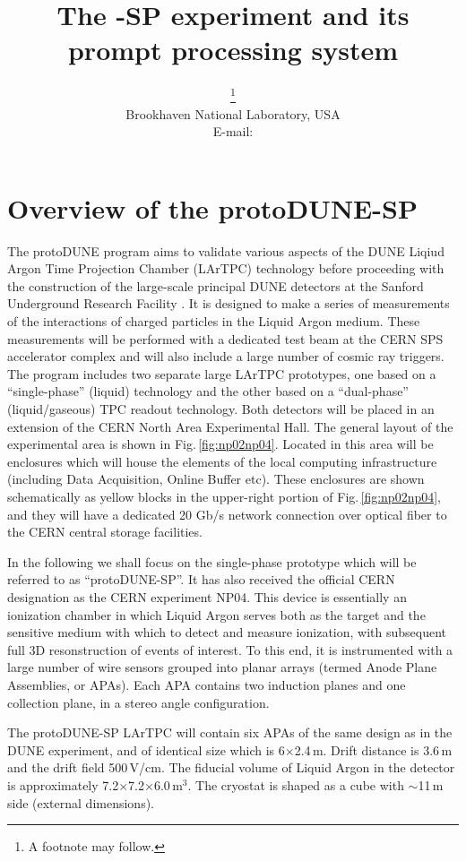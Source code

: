 \documentclass{PoS}
\title{The \pd-SP experiment and its prompt processing system}
\author{\speaker{Maxim Potekhin}\thanks{A footnote may follow.}\\
        Brookhaven National Laboratory, USA\\
        E-mail: \email{potekhin@bnl.gov}}
\newcommand{\pd}{protoDUNE\xspace}
\begin{document}
\section{Overview of the protoDUNE-SP}
The \pd program aims to validate various aspects of the DUNE  Liqiud Argon Time Projection Chamber (LArTPC)  technology 
before proceeding with the construction of the large-scale principal DUNE detectors at the Sanford Underground Research
Facility \cite{cdrVol1, cdrVol4}. It  is designed to make a series of measurements of the interactions of
charged particles in the Liquid Argon medium.  These measurements will be performed with a dedicated test
beam  at the CERN SPS accelerator complex and will also include
a large number of cosmic ray triggers. The program includes two separate
large LArTPC prototypes, one based on a ``single-phase'' (liquid) technology and
the other based on a ``dual-phase'' (liquid/gaseous) TPC readout technology.
Both detectors will be placed in an extension of the CERN North Area Experimental Hall.
The general layout of the experimental area is shown in Fig.\,\ref{fig:np02np04}.
Located in this  area will be enclosures which will house the elements of the local computing infrastructure
(including Data Acquisition, Online Buffer etc). These enclosures are shown schematically as yellow blocks in the
upper-right portion of Fig.\,\ref{fig:np02np04}, and they will have a dedicated 20 Gb/s
network connection over optical fiber to the CERN central storage facilities.

In the following we shall focus on the single-phase prototype which will be referred to as ``protoDUNE-SP''.
It has also received the official CERN designation as the CERN experiment NP04.
This device is essentially an ionization chamber in which Liquid Argon serves both as the target and
the sensitive medium with which to detect and measure ionization, with subsequent full 3D resonstruction of
events of interest. To this end, it is instrumented with a large number
of wire sensors grouped into planar arrays (termed Anode Plane Assemblies, or APAs). Each APA contains
two induction planes and one collection plane, in a stereo angle configuration.

The protoDUNE-SP LArTPC will contain six APAs of the same design as in the DUNE
experiment, and of identical size which is 6$\times$2.4\,m. Drift distance is 3.6\,m
and the drift field 500\,V/cm. The fiducial volume of Liquid Argon in the detector
is approximately 7.2$\times$7.2$\times$6.0\,m$^3$. The cryostat is shaped as a cube
with $\sim$11\,m side (external dimensions).
\end{document}
